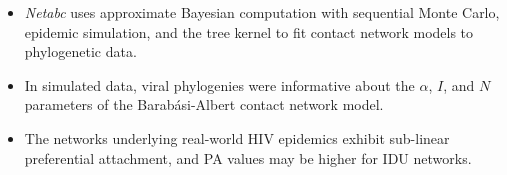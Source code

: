 \begin{frame}
  \begin{itemize}
    \setlength{\itemsep}{12pt}
    \item \textit{Netabc} uses approximate Bayesian computation with sequential
      Monte Carlo, epidemic simulation, and the tree kernel to fit contact
      network models to phylogenetic data.
    \pause
    \item In simulated data, viral phylogenies were informative about the
      $\alpha$, $I$, and $N$ parameters of the Barab\'asi-Albert contact
      network model.
    \pause
    \item The networks underlying real-world HIV epidemics exhibit sub-linear
      preferential attachment, and PA values may be higher for IDU networks.
  \end{itemize}
\end{frame}
